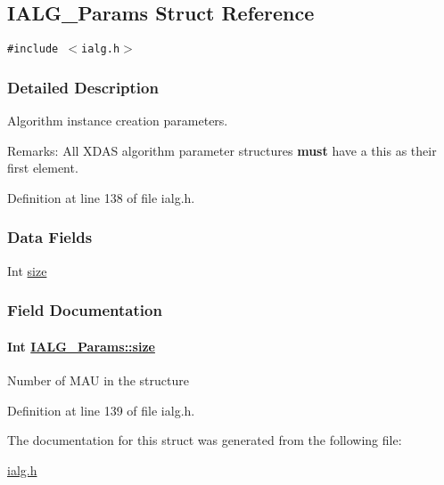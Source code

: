 \hypertarget{struct_i_a_l_g___params}{
\subsection{IALG\_\-Params Struct Reference}
\label{struct_i_a_l_g___params}
}
{\tt \#include $<$ialg.h$>$}



\subsubsection{Detailed Description}
Algorithm instance creation parameters. 

\begin{Desc}
\item[Remarks:]All XDAS algorithm parameter structures {\bf must} have a this as their first element. \end{Desc}




Definition at line 138 of file ialg.h.\subsubsection*{Data Fields}
\begin{CompactItemize}
\item 
Int \hyperlink{struct_i_a_l_g___params_f8fa239e38c54b8202e30292e99089c4}{size}
\end{CompactItemize}


\subsubsection{Field Documentation}
\hypertarget{struct_i_a_l_g___params_f8fa239e38c54b8202e30292e99089c4}{
\paragraph[size]{\setlength{\rightskip}{0pt plus 5cm}Int \hyperlink{struct_i_a_l_g___params_f8fa239e38c54b8202e30292e99089c4}{IALG\_\-Params::size}}\hfill}
\label{struct_i_a_l_g___params_f8fa239e38c54b8202e30292e99089c4}


Number of MAU in the structure 

Definition at line 139 of file ialg.h.

The documentation for this struct was generated from the following file:\begin{CompactItemize}
\item 
\hyperlink{ialg_8h}{ialg.h}\end{CompactItemize}
